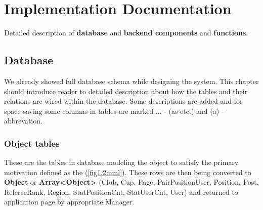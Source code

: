 \chapter{Implementation Documentation}
Detailed description of \textbf{database} and \textbf{backend components} and \textbf{functions}.  

\section{Database}
We already showed full database schema while designing the system. This chapter should introduce reader to detailed description about how the tables and their relations are wired within the database.  
\newline
Some descriptions are added and for space saving some columns in tables are marked ... - (as etc.) and (a) - abbrevation.
\subsection{Object tables}
These are the tables in database modeling the object to satisfy the primary motivation defined as the (\autoref{fig1.2:uml}). These rows are then being converted to \textbf{Object} or \textbf{Array\textless Object\textgreater}  (Club, Cup, Page, PairPositionUser, Position, Post, RefereeRank, Region, StatPositionCnt, StatUserCnt, User) and returned to application page by appropriate Manager.

